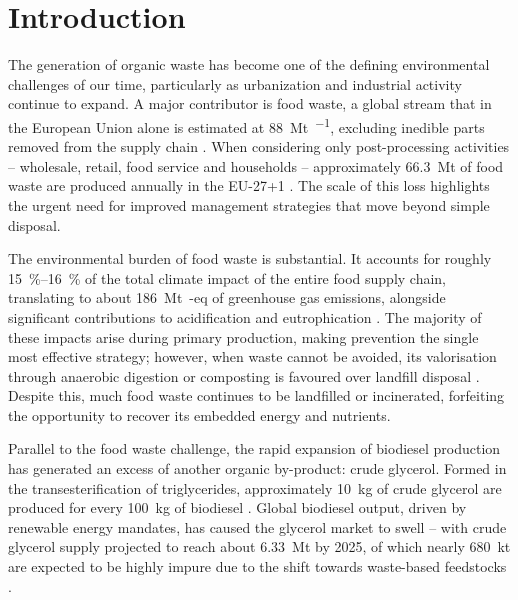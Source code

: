 \chapter{Introduction}
\label{ch:introduction}

The generation of organic waste has become one of the defining environmental challenges of our time, particularly as urbanization and industrial activity continue to expand. A major contributor is food waste, a global stream that in the European Union alone is estimated at \qty{88}{\mega\tonne\per\yr}, excluding inedible parts removed from the supply chain \parencite{scherhaufer2018}. When considering only post-processing activities – wholesale, retail, food service and households – approximately \qty{66.3}{\mega\tonne} of food waste are produced annually in the EU-27+1 \parencite{albizzati2021}. The scale of this loss highlights the urgent need for improved management strategies that move beyond simple disposal.

The environmental burden of food waste is substantial. It accounts for roughly \qtyrange{15}{16}{\percent} of the total climate impact of the entire food supply chain, translating to about \qty{186}{\mega\tonne\CO}-eq of greenhouse gas emissions, alongside significant contributions to acidification and eutrophication \parencite{scherhaufer2018}. The majority of these impacts arise during primary production, making prevention the single most effective strategy; however, when waste cannot be avoided, its valorisation through anaerobic digestion or composting is favoured over landfill disposal \parencite{albizzati2021, scherhaufer2018}. Despite this, much food waste continues to be landfilled or incinerated, forfeiting the opportunity to recover its embedded energy and nutrients.

Parallel to the food waste challenge, the rapid expansion of biodiesel production has generated an excess of another organic by-product: crude glycerol. Formed in the transesterification of triglycerides, approximately \qty{10}{\kilo\gram} of crude glycerol are produced for every \qty{100}{\kilo\gram} of biodiesel \parencite{garlapati2016}. Global biodiesel output, driven by renewable energy mandates, has caused the glycerol market to swell – with crude glycerol supply projected to reach about \qty{6.33}{\mega\tonne} by 2025, of which nearly \qty{680}{\kilo\tonne} are expected to be highly impure due to the shift towards waste-based feedstocks \parencite{attarbachi2023}.

